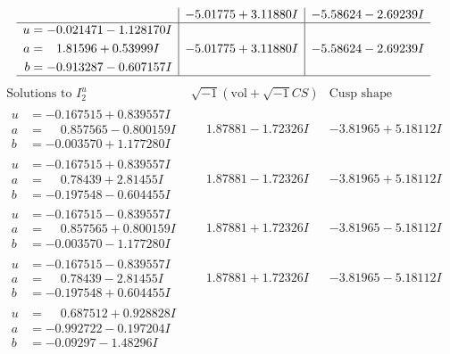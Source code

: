 \documentclass[1p]{elsarticle_modified}
\theoremstyle{definition}
\newcommand{\I}{\sqrt{-1}}
\begin{document}
$$\begin{array}{c|c|c}
 & -5.01775 + 3.11880 I & -5.58624 - 2.69239 I \\ \hline\begin{aligned}
u &= -0.021471 - 1.128170 I \\
a &= \phantom{-}1.81596 + 0.53999 I \\
b &= -0.913287 - 0.607157 I\end{aligned}
 & -5.01775 + 3.11880 I & -5.58624 - 2.69239 I\\
 \hline 
 \end{array}$$\newpage$$\begin{array}{c|c|c}  
\text{Solutions to }I^u_{2}& \I (\text{vol} + \sqrt{-1}CS) & \text{Cusp shape}\\
 \hline 
\begin{aligned}
u &= -0.167515 + 0.839557 I \\
a &= \phantom{-}0.857565 - 0.800159 I \\
b &= -0.003570 + 1.177280 I\end{aligned}
 & \phantom{-}1.87881 - 1.72326 I & -3.81965 + 5.18112 I \\ \hline\begin{aligned}
u &= -0.167515 + 0.839557 I \\
a &= \phantom{-}0.78439 + 2.81455 I \\
b &= -0.197548 - 0.604455 I\end{aligned}
 & \phantom{-}1.87881 - 1.72326 I & -3.81965 + 5.18112 I \\ \hline\begin{aligned}
u &= -0.167515 - 0.839557 I \\
a &= \phantom{-}0.857565 + 0.800159 I \\
b &= -0.003570 - 1.177280 I\end{aligned}
 & \phantom{-}1.87881 + 1.72326 I & -3.81965 - 5.18112 I \\ \hline\begin{aligned}
u &= -0.167515 - 0.839557 I \\
a &= \phantom{-}0.78439 - 2.81455 I \\
b &= -0.197548 + 0.604455 I\end{aligned}
 & \phantom{-}1.87881 + 1.72326 I & -3.81965 - 5.18112 I \\ \hline\begin{aligned}
u &= \phantom{-}0.687512 + 0.928828 I \\
a &= -0.992722 - 0.197204 I \\
b &= -0.09297 - 1.48296 I\end{aligned}

\end{array}$$
\end{document}
